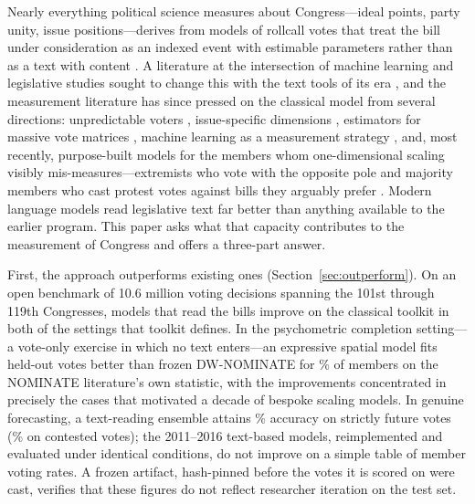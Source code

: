 \documentclass[12pt]{article}
\begin{document}
Nearly everything political science measures about Congress---ideal
points, party unity, issue positions---derives from models of
rollcall votes that treat the bill under consideration as an indexed
event with estimable parameters rather than as a text with content
\citep{poole1997congress, clinton2004statistical}. A literature at
the intersection of machine learning and legislative studies sought
to change this with the text tools of its era
\citep{gerrish2011predicting, kraft2016embedding}, and the
measurement literature has since pressed on the classical model from
several directions: unpredictable voters
\citep{lauderdale2010unpredictable}, issue-specific dimensions
\citep{lauderdale2014scaling, crespin2010dimensions}, estimators for
massive vote matrices \citep{imai2016fast}, machine learning as a
measurement strategy \citep{bonica2018inferring}, and, most recently,
purpose-built models for the members whom one-dimensional scaling
visibly mis-measures---extremists who vote with the opposite pole
\citep{duckmayr2023ends} and majority members who cast protest votes
against bills they arguably prefer \citep{fowler2026protest}. Modern
language models read legislative text far better than anything
available to the earlier program. This paper asks what that capacity
contributes to the measurement of Congress and offers a three-part
answer.

First, the approach outperforms existing ones
(Section~\ref{sec:outperform}). On an open benchmark of 10.6 million
voting decisions spanning the 101st through 119th Congresses, models
that read the bills improve on the classical toolkit in both of the
settings that toolkit defines. In the psychometric completion
setting---a vote-only exercise in which no text enters---an
expressive spatial model fits held-out votes better than frozen
DW-NOMINATE for \memberGMPshare\% of members on the NOMINATE
literature's own statistic, with the improvements concentrated in
precisely the cases that motivated a decade of bespoke scaling
models. In genuine
forecasting, a text-reading ensemble attains \champForecastAcc\%
accuracy on strictly future votes (\champContestedAcc\% on contested
votes); the 2011--2016 text-based models, reimplemented and evaluated
under identical conditions, do not improve on a simple table of
member voting rates. A frozen artifact, hash-pinned before the votes
it is scored on were cast, verifies that these figures do not reflect
researcher iteration on the test set.
\end{document}
